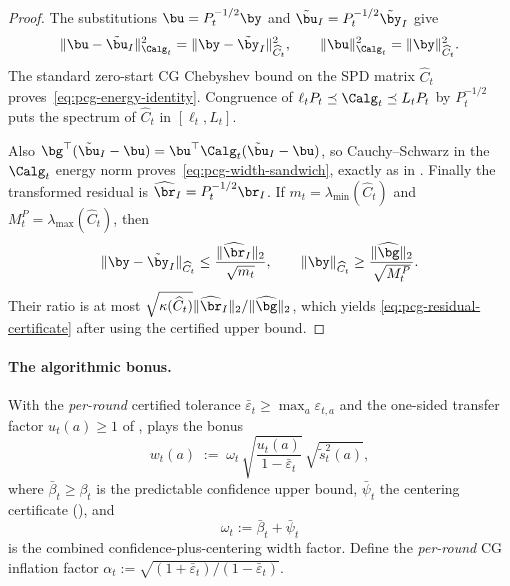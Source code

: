 \begin{proof}
The substitutions $\bu=P_t^{-1/2}\by$ and
$\tilde\bu_I=P_t^{-1/2}\tilde\by_I$ give
\[
 \|\bu-\tilde\bu_I\|_{\Calg_t}^2
 =\|\by-\tilde\by_I\|_{\widehat C_t}^2,
 \qquad
 \|\bu\|_{\Calg_t}^2=\|\by\|_{\widehat C_t}^2.
\]
The standard zero-start CG Chebyshev bound on the SPD matrix $\widehat C_t$
proves~\eqref{eq:pcg-energy-identity}.  Congruence of
$\ell_tP_t\preceq\Calg_t\preceq L_tP_t$ by $P_t^{-1/2}$ puts the spectrum of
$\widehat C_t$ in $[\ell_t,L_t]$.

Also
$\bg^\top(\tilde\bu_I-\bu)=
\bu^\top\Calg_t(\tilde\bu_I-\bu)$, so Cauchy--Schwarz in the
$\Calg_t$ energy norm proves~\eqref{eq:pcg-width-sandwich}, exactly as in
.  Finally the transformed residual is
$\widehat\br_I=P_t^{-1/2}\br_I$.  If
$m_t=\lambda_{\min}(\widehat C_t)$ and
$M_t^P=\lambda_{\max}(\widehat C_t)$, then
\[
 \|\by-\tilde\by_I\|_{\widehat C_t}
 \le\frac{\|\widehat\br_I\|_2}{\sqrt{m_t}},
 \qquad
 \|\by\|_{\widehat C_t}
 \ge\frac{\|\widehat\bg\|_2}{\sqrt{M_t^P}}.
\]
Their ratio is at most
$\sqrt{\kappa(\widehat C_t)}
\|\widehat\br_I\|_2/\|\widehat\bg\|_2$, which yields
\eqref{eq:pcg-residual-certificate} after using the certified upper bound.
\end{proof}
\fi

\paragraph{The algorithmic bonus.}
With the \emph{per-round} certified tolerance
$\bar\varepsilon_t\ge\max_a\varepsilon_{t,a}$ and the one-sided transfer factor
$u_t(a)\ge1$ of ,  plays the bonus
\begin{equation}\label{eq:bonus}
  w_t(a)
  \;:=\;
  \omega_t\,
  \sqrt{\frac{u_t(a)}{1-\bar\varepsilon_t}}\,
  \sqrt{\tilde{s}_t^2(a)},
\end{equation}
where $\bar\beta_t\ge\beta_t$ is the predictable confidence upper bound,
$\bar\psi_t$ the centering certificate (), and
\begin{equation}\label{eq:omega-def}
  \omega_t := \bar\beta_t+\bar\psi_t
\end{equation}
is the combined confidence-plus-centering width factor.  Define the
\emph{per-round} CG inflation factor
$\alpha_t:=\sqrt{(1+\bar\varepsilon_t)/(1-\bar\varepsilon_t)}$.

